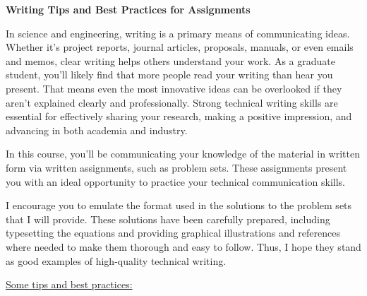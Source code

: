 \documentclass[11pt]{article}
\begin{document}
\textbf{Writing Tips and Best Practices for Assignments}

In science and engineering, writing is a primary means of communicating ideas. Whether it's project reports, journal articles, proposals, manuals, or even emails and memos, clear writing helps others understand your work. As a graduate student, you'll likely find that more people read your writing than hear you present. That means even the most innovative ideas can be overlooked if they aren't explained clearly and professionally. Strong technical writing skills are essential for effectively sharing your research, making a positive impression, and advancing in both academia and industry.

In this course, you'll be communicating your knowledge of the material in written form via written assignments, such as problem sets. These assignments present you with an ideal opportunity to practice your technical communication skills.

I encourage you to emulate the format used in the solutions to the problem sets that I will provide. These solutions have been carefully prepared, including typesetting the equations and providing graphical illustrations and references where needed to make them thorough and easy to follow. Thus, I hope they stand as good examples of high-quality technical writing.

\underline{Some tips and best practices:}
\end{document}
